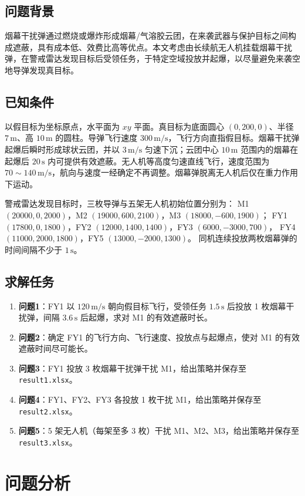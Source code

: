 \documentclass[withoutpreface,bwprint]{cumcmthesis}
\begin{document}
\subsection{问题背景}
烟幕干扰弹通过燃烧或爆炸形成烟幕/气溶胶云团，在来袭武器与保护目标之间构成遮蔽，具有成本低、效费比高等优点。本文考虑由长续航无人机挂载烟幕干扰弹，在警戒雷达发现目标后受领任务，于特定空域投放并起爆，以尽量避免来袭空地导弹发现真目标。

\subsection{已知条件}
以假目标为坐标原点，水平面为 $xy$ 平面。真目标为底面圆心 $(0,200,0)$、半径 $7\,\mathrm{m}$、高 $10\,\mathrm{m}$ 的圆柱。导弹飞行速度 $300\,\mathrm{m/s}$，飞行方向直指假目标。烟幕干扰弹起爆后瞬时形成球状云团，并以 $3\,\mathrm{m/s}$ 匀速下沉；云团中心 $10\,\mathrm{m}$ 范围内的烟幕在起爆后 $20\,\mathrm{s}$ 内可提供有效遮蔽。无人机等高度匀速直线飞行，速度范围为 $70\sim140\,\mathrm{m/s}$，航向与速度一经确定不再调整。烟幕弹脱离无人机后仅在重力作用下运动。

警戒雷达发现目标时，三枚导弹与五架无人机初始位置分别为：
M1 $(20000,0,2000)$，M2 $(19000,600,2100)$，M3 $(18000,-600,1900)$；
FY1 $(17800,0,1800)$，FY2 $(12000,1400,1400)$，FY3 $(6000,-3000,700)$，
FY4 $(11000,2000,1800)$，FY5 $(13000,-2000,1300)$。
同机连续投放两枚烟幕弹的时间间隔不少于 $1\,\mathrm{s}$。

\subsection{求解任务}
\begin{enumerate}
  \item \textbf{问题1}：FY1 以 $120\,\mathrm{m/s}$ 朝向假目标飞行，受领任务 $1.5\,\mathrm{s}$ 后投放 1 枚烟幕干扰弹，间隔 $3.6\,\mathrm{s}$ 后起爆，求对 M1 的有效遮蔽时长。
  \item \textbf{问题2}：确定 FY1 的飞行方向、飞行速度、投放点与起爆点，使对 M1 的有效遮蔽时间尽可能长。
  \item \textbf{问题3}：FY1 投放 3 枚烟幕干扰弹干扰 M1，给出策略并保存至 \texttt{result1.xlsx}。
  \item \textbf{问题4}：FY1、FY2、FY3 各投放 1 枚干扰 M1，给出策略并保存至 \texttt{result2.xlsx}。
  \item \textbf{问题5}：5 架无人机（每架至多 3 枚）干扰 M1、M2、M3，给出策略并保存至 \texttt{result3.xlsx}。
\end{enumerate}

\section{问题分析}
\end{document}
